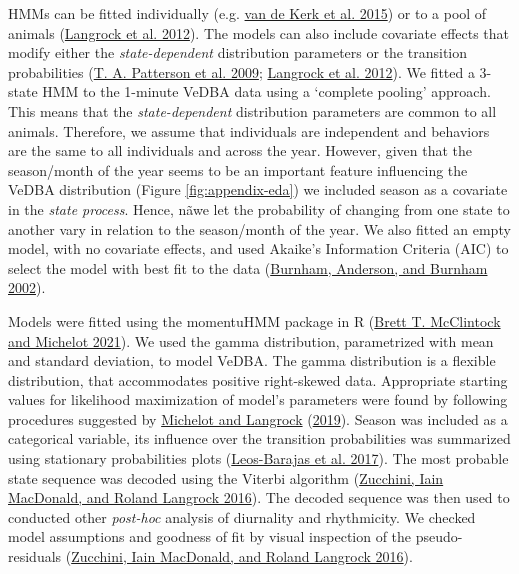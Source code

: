 \documentclass[english,msc,numbers,hidelinks]{coppe}
\begin{document}
  HMMs can be fitted individually (e.g. \protect\hyperlink{ref-vandekerk2015}{van de Kerk et al. 2015}) or to a pool of animals (\protect\hyperlink{ref-langrock2012}{Langrock et al. 2012}). The models can also include covariate effects that modify either the \emph{state-dependent} distribution parameters or the transition probabilities (\protect\hyperlink{ref-patterson2009}{T. A. Patterson et al. 2009}; \protect\hyperlink{ref-langrock2012}{Langrock et al. 2012}). We fitted a 3-state HMM to the 1-minute VeDBA data using a `complete pooling' approach. This means that the \emph{state-dependent} distribution parameters are common to all animals. Therefore, we assume that individuals are independent and behaviors are the same to all individuals and across the year. However, given that the season/month of the year seems to be an important feature influencing the VeDBA distribution (Figure \ref{fig:appendix-eda}) we included season as a covariate in the \emph{state process}. Hence, nãwe let the probability of changing from one state to another vary in relation to the season/month of the year. We also fitted an empty model, with no covariate effects, and used Akaike's Information Criteria (AIC) to select the model with best fit to the data (\protect\hyperlink{ref-burnham2002}{Burnham, Anderson, and Burnham 2002}).

  Models were fitted using the momentuHMM package in R (\protect\hyperlink{ref-mcclintock2021}{Brett T. McClintock and Michelot 2021}). We used the gamma distribution, parametrized with mean and standard deviation, to model VeDBA. The gamma distribution is a flexible distribution, that accommodates positive right-skewed data. Appropriate starting values for likelihood maximization of model's parameters were found by following procedures suggested by \protect\hyperlink{ref-michelot2019}{Michelot and Langrock} (\protect\hyperlink{ref-michelot2019}{2019}). Season was included as a categorical variable, its influence over the transition probabilities was summarized using stationary probabilities plots (\protect\hyperlink{ref-leosbarajas2017}{Leos-Barajas et al. 2017}). The most probable state sequence was decoded using the Viterbi algorithm (\protect\hyperlink{ref-zucchini2016}{Zucchini, Iain MacDonald, and Roland Langrock 2016}). The decoded sequence was then used to conducted other \emph{post-hoc} analysis of diurnality and rhythmicity. We checked model assumptions and goodness of fit by visual inspection of the pseudo-residuals (\protect\hyperlink{ref-zucchini2016}{Zucchini, Iain MacDonald, and Roland Langrock 2016}).
\end{document}
